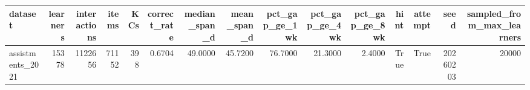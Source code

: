 \begin{tabular}{lrrrrrrrrrrrrrr}
\toprule
dataset & learners & interactions & items & KCs & correct\_rate & median\_span\_d & mean\_span\_d & pct\_gap\_ge\_1wk & pct\_gap\_ge\_4wk & pct\_gap\_ge\_8wk & hint & attempt & seed & sampled\_from\_max\_learners \\
\midrule
assistments\_2021 & 15378 & 1122656 & 71152 & 398 & 0.6704 & 49.0000 & 45.7200 & 76.7000 & 21.3000 & 2.4000 & True & True & 20260203 & 20000 \\
\bottomrule
\end{tabular}
